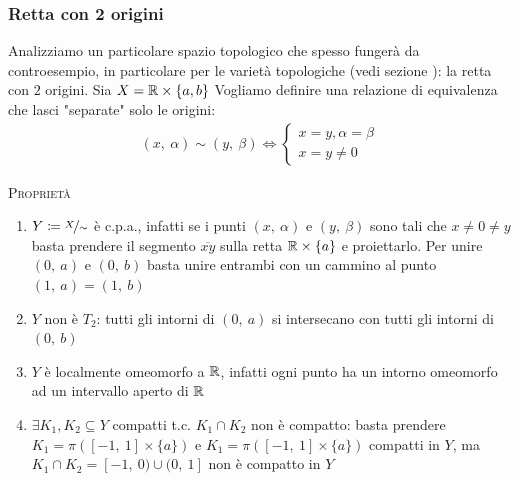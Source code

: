\subsubsection{Retta con 2 origini}
Analizziamo un particolare spazio topologico che spesso fungerà da controesempio, in particolare per le varietà topologiche (vedi sezione   ): la retta con $2$ origini. \newline
Sia $X=\mathbb{R}\times\{a,b\}$ 
Vogliamo definire una relazione di equivalenza che lasci "separate" solo le origini:
	\begin{gather*}
		(x, \ \alpha)\sim (y, \ \beta) \iff 
			\begin{cases}
				x=y, \alpha=\beta \\
				x=y\neq 0
			\end{cases}		
	\end{gather*}

\textsc{Proprietà}
\begin{enumerate}
	\item $Y\coloneqq \nicefrac{X}{\sim}$ è c.p.a., infatti se i punti $(x, \ \alpha)$ e $(y, \ \beta)$ sono tali che $x\neq 0 \neq y$ basta prendere il segmento $\overline{xy}$ sulla retta $\mathbb{R}\times\{a\}$ e proiettarlo. Per unire $(0,\ a)$ e $(0, \ b)$ basta unire entrambi con un cammino al punto $(1, \ a)=(1, \ b)$
	\item $Y$ non è $T_2$: tutti gli intorni di $(0, \ a)$ si intersecano con tutti gli 	intorni di $(0, \ b)$ 
	\item $Y$ è localmente omeomorfo a $\mathbb{R}$, infatti ogni punto ha un intorno omeomorfo ad un intervallo aperto di $\mathbb{R}$
	\item $\exists K_1, K_2\subseteq Y$ compatti t.c. $K_1\cap K_2$ non è compatto: basta prendere $K_1=\pi\left([-1, \ 1]\times \{a\} \right)$ e $K_1=\pi\left([-1, \ 1]\times \{a\} \right)$ compatti in $Y$, ma $K_1\cap K_2= [-1,\ 0) \cup (0,\ 1]$ non è compatto in $Y$
\end{enumerate}

